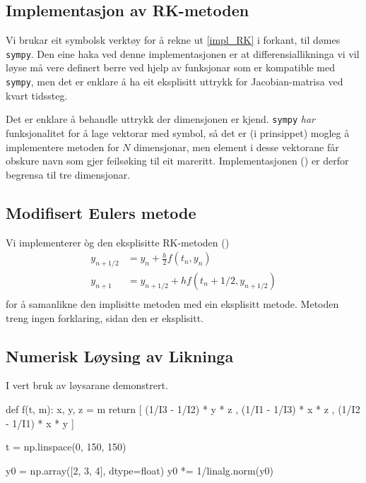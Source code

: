 \documentclass[12pt]{article}
\begin{document}
\begin{multicols}{2}
    \subsection{Implementasjon av RK-metoden}
    Vi brukar eit symbolsk verktøy for å rekne ut \eqref{impl_RK}
    i forkant, til dømes {\tt sympy}.
    Den eine haka ved denne implementasjonen er at differensiallikninga vi
    vil løyse må vere definert berre ved hjelp av
    funksjonar som er kompatible med {\tt sympy},
    men det er enklare å ha eit eksplisitt uttrykk for
    Jacobian-matrisa ved kvart tidssteg.

    Det er enklare å
    behandle uttrykk der dimensjonen er kjend.
    {\tt sympy} {\em har} funksjonalitet for å lage
    vektorar med symbol, så det er (i prinsippet) mogleg
    å implementere metoden for $N$ dimensjonar,
    men element i desse vektorane får obskure navn som gjer feilsøking til eit mareritt.
    Implementasjonen () er derfor begrensa til tre dimensjonar.

    \subsection{Modifisert Eulers metode}
    Vi implementerer \`og den eksplisitte RK-metoden ()
    \begin{align*}
        y_{n+1/2} &= y_n + \frac h 2 f\left(t_n, y_n\right) \\
        y_{n+1} &= y_{n+1/2} + h f\left(t_n + 1/2, y_{n+1/2}\right) \\
    \end{align*}
    for å samanlikne den implisitte metoden med ein eksplisitt metode.
    Metoden treng ingen forklaring, sidan den er eksplisitt.

    \subsection{Numerisk Løysing av Likninga}
    I  vert bruk av løysarane demonstrert.

    \noindent\begin{minipage}{\linewidth}
    \begin{python}[caption={Bruk av RK-løysarane},label=lst:solver]
def f(t, m):
    x, y, z = m
    return [ (1/I3 - 1/I2) * y * z ,
             (1/I1 - 1/I3) * x * z ,
             (1/I2 - 1/I1) * x * y ]

t = np.linspace(0, 150, 150)

y0 = np.array([2, 3, 4], dtype=float)
y0 *= 1/linalg.norm(y0)


\end{python}
\end{minipage}
\end{multicols}
\end{document}

